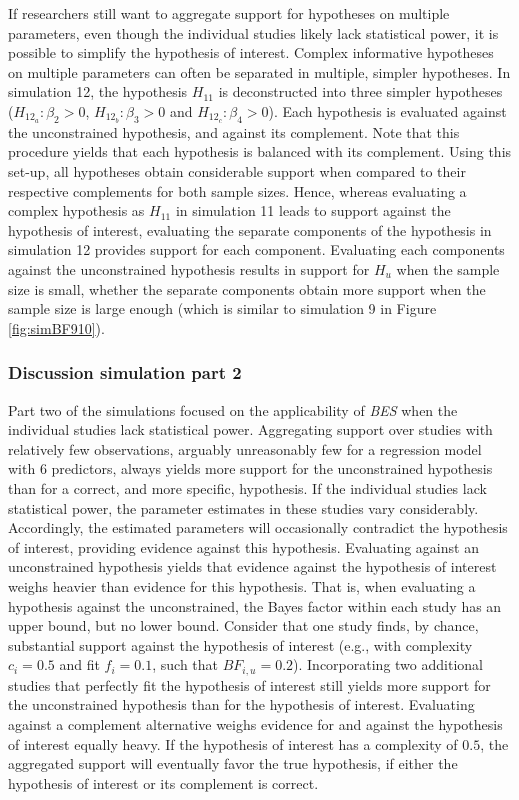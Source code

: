 \documentclass[review, 3p, authoryear]{elsarticle} %
\begin{document}
If researchers still want to aggregate support for hypotheses on multiple parameters, even though the individual studies likely lack statistical power, it is possible to simplify the hypothesis of interest.
Complex informative hypotheses on multiple parameters can often be separated in multiple, simpler hypotheses.
In simulation 12, the hypothesis \(H_{11}\) is deconstructed into three simpler hypotheses (\(H_{12_a}: \beta_2 > 0\), \(H_{12_b}: \beta_3 > 0\) and \(H_{12_c}: \beta_4 > 0\)).
Each hypothesis is evaluated against the unconstrained hypothesis, and against its complement.
Note that this procedure yields that each hypothesis is balanced with its complement.
Using this set-up, all hypotheses obtain considerable support when compared to their respective complements for both sample sizes.
Hence, whereas evaluating a complex hypothesis as \(H_{11}\) in simulation 11 leads to support against the hypothesis of interest, evaluating the separate components of the hypothesis in simulation 12 provides support for each component.
Evaluating each components against the unconstrained hypothesis results in support for \(H_u\) when the sample size is small, whether the separate components obtain more support when the sample size is large enough (which is similar to simulation 9 in Figure \ref{fig:simBF910}).

\hypertarget{discussion-simulation-part-2}{%
\subsubsection{Discussion simulation part 2}\label{discussion-simulation-part-2}}

Part two of the simulations focused on the applicability of \emph{BES} when the individual studies lack statistical power.
Aggregating support over studies with relatively few observations, arguably unreasonably few for a regression model with \(6\) predictors, always yields more support for the unconstrained hypothesis than for a correct, and more specific, hypothesis.
If the individual studies lack statistical power, the parameter estimates in these studies vary considerably.
Accordingly, the estimated parameters will occasionally contradict the hypothesis of interest, providing evidence against this hypothesis.
Evaluating against an unconstrained hypothesis yields that evidence against the hypothesis of interest weighs heavier than evidence for this hypothesis.
That is, when evaluating a hypothesis against the unconstrained, the Bayes factor within each study has an upper bound, but no lower bound.
Consider that one study finds, by chance, substantial support against the hypothesis of interest (e.g., with complexity \(c_i = 0.5\) and fit \(f_i = 0.1\), such that \(BF_{i,u} = 0.2\)).
Incorporating two additional studies that perfectly fit the hypothesis of interest still yields more support for the unconstrained hypothesis than for the hypothesis of interest.
Evaluating against a complement alternative weighs evidence for and against the hypothesis of interest equally heavy.
If the hypothesis of interest has a complexity of \(0.5\), the aggregated support will eventually favor the true hypothesis, if either the hypothesis of interest or its complement is correct.
\end{document}
